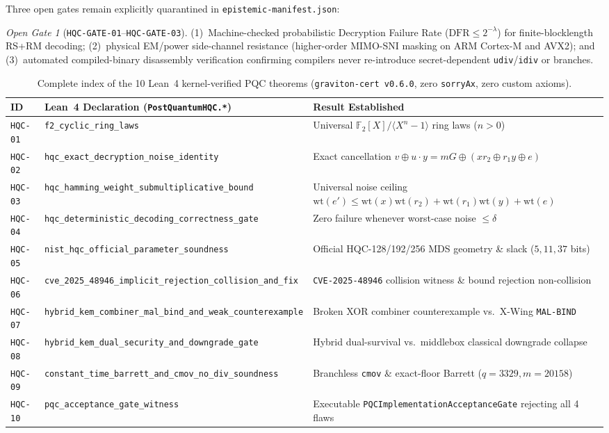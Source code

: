 \documentclass[11pt,a4paper]{article}
\theoremstyle{plain}
\theoremstyle{remark}
\newtheorem{gate}[theorem]{Open Gate}
\newcommand{\code}[1]{\texttt{\small #1}}
\newcommand{\Ftwo}{\mathbb{F}_2}
\newcommand{\wt}{\mathrm{wt}}
\begin{document}
Three open gates remain explicitly quarantined in \code{epistemic-manifest.json}:
\begin{gate}[\code{HQC-GATE-01}--\code{HQC-GATE-03}]
(1)~Machine-checked probabilistic Decryption Failure Rate ($\mathrm{DFR} \le 2^{-\lambda}$) for finite-blocklength RS+RM decoding; (2)~physical EM/power side-channel resistance (higher-order MIMO-SNI masking on ARM Cortex-M and AVX2); and (3)~automated compiled-binary disassembly verification confirming compilers never re-introduce secret-dependent \code{udiv}/\code{idiv} or branches.
\end{gate}

\begin{table}[t]
\centering
\scriptsize
\renewcommand{\code}[1]{\texttt{#1}}
\setlength{\tabcolsep}{4pt}
\renewcommand{\arraystretch}{1.15}
\begin{tabular}{@{}l >{\tiny}l >{\raggedright\arraybackslash}p{7.2cm}@{}}
\toprule
\textbf{ID} & {\scriptsize\textbf{Lean~4 Declaration (\code{PostQuantumHQC.*})}} & \textbf{Result Established} \\
\midrule
\code{HQC-01} & \code{f2\_cyclic\_ring\_laws} & Universal $\Ftwo[X]/\langle X^n-1\rangle$ ring laws ($n>0$) \\
\code{HQC-02} & \code{hqc\_exact\_decryption\_noise\_identity} & Exact cancellation $v\oplus u\cdot y = mG\oplus (x r_2\oplus r_1 y\oplus e)$ \\
\code{HQC-03} & \code{hqc\_hamming\_weight\_submultiplicative\_bound} & Universal noise ceiling $\wt(e')\le \wt(x)\wt(r_2)+\wt(r_1)\wt(y)+\wt(e)$ \\
\code{HQC-04} & \code{hqc\_deterministic\_decoding\_correctness\_gate} & Zero failure whenever worst-case noise $\le \delta$ \\
\code{HQC-05} & \code{nist\_hqc\_official\_parameter\_soundness} & Official HQC-128/192/256 MDS geometry \& slack ($5,11,37$ bits) \\
\code{HQC-06} & \code{cve\_2025\_48946\_implicit\_rejection\_collision\_and\_fix} & \code{CVE-2025-48946} collision witness \& bound rejection non-collision \\
\code{HQC-07} & \code{hybrid\_kem\_combiner\_mal\_bind\_and\_weak\_counterexample} & Broken XOR combiner counterexample vs.\ X-Wing \code{MAL-BIND} \\
\code{HQC-08} & \code{hybrid\_kem\_dual\_security\_and\_downgrade\_gate} & Hybrid dual-survival vs.\ middlebox classical downgrade collapse \\
\code{HQC-09} & \code{constant\_time\_barrett\_and\_cmov\_no\_div\_soundness} & Branchless \code{cmov} \& exact-floor Barrett ($q=3329, m=20158$) \\
\code{HQC-10} & \code{pqc\_acceptance\_gate\_witness} & Executable \code{PQCImplementationAcceptanceGate} rejecting all 4 flaws \\
\bottomrule
\end{tabular}
\caption{Complete index of the 10 Lean~4 kernel-verified PQC theorems (\code{graviton-cert v0.6.0}, zero \code{sorryAx}, zero custom axioms).}
\label{tab:hqc}
\end{table}
\end{document}
